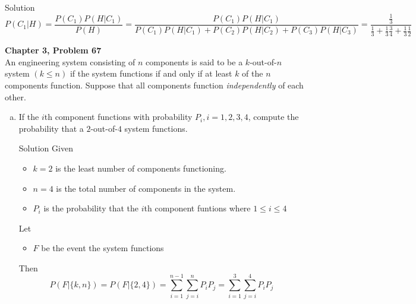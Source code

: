 \documentclass{article}
\begin{document}
\begin{spacing}{1.1}
\begin{homeworkProblem}
\begin{homeworkSection}{Solution}
    \[P( C_1|H) = \frac{ P( C_1) P( H|C_1)}{ P( H)} 
    = \frac{ P( C_1) P( H|C_1)}{ P( C_1) P( H|C_1) + P( C_2) P( H|C_2) + P( C_3) P( H|C_3)} 
    = \frac{ \frac{ 1}{ 3}}{ \frac{ 1}{ 3} + \frac{ 1}{ 3} \frac{ 3}{ 4} + \frac{ 1}{ 3} \frac{ 1}{ 2}}\]
  \end{homeworkSection}
\end{homeworkProblem}
\newpage
\begin{homeworkProblem}
  {\bf Chapter 3, Problem 67}\\
  An engineering system consisting of $n$ components is said to be a $k$-out-of-$n$ system $(k \le n)$ if 
  the system functions if and only if at least $k$ of the $n$ components function. Suppose that all 
  components function \emph{independently} of each other.
  \begin{enumerate}[(a)]
    \item If the $i$th component functions with probability $P_i,i = 1, 2, 3, 4$, compute the 
          probability that a $2$-out-of-$4$ system functions. 
      \begin{homeworkSection}{Solution}
        Given
          \begin{itemize}
            \item $k = 2$ is the least number of components functioning.
            \item $n = 4$ is the total number of components in the system.
            \item $P_i$ is the probability that the $i$th component funtions where $ 1 \le i \le 4$
          \end{itemize}
        Let
          \begin{itemize}
            \item $F$ be the event the system functions
          \end{itemize}
        Then
          \[P( F|\{k,n\}) = P( F|\{2,4\}) = \sum\limits_{i = 1}^{n - 1}{ \sum\limits_{j = i}^{n}{ P_i P_j}} = \sum\limits_{i = 1}^{3}{ \sum\limits_{j = i}^{4}{ P_i P_j}}\]
    

\end{homeworkSection}
\end{enumerate}
\end{homeworkProblem}
\end{spacing}
\end{document}
